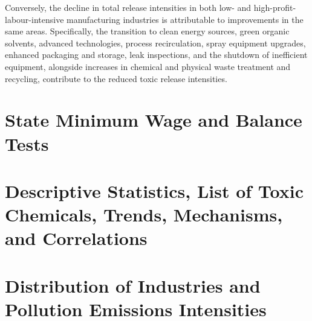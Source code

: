 \documentclass[12pt, english]{article}
\begin{document}
    Conversely, the decline in total release intensities in both low- and high-profit-labour-intensive manufacturing industries is attributable to improvements in the same areas. Specifically, the transition to clean energy sources, green organic solvents, advanced technologies, process recirculation, spray equipment upgrades, enhanced packaging and storage, leak inspections, and the shutdown of inefficient equipment, alongside increases in chemical and physical waste treatment and recycling, contribute to the reduced toxic release intensities.
    \newpage
    \begin{appendices}
        \renewcommand\thesection{\Roman{section}} %
        \renewcommand\thesubsection{\Alph{subsection}} %


        \section{State Minimum Wage and Balance Tests}\label{sec:appendix-state-minimum-wage-and-balance-tests}
        
        
        
        
        


        \section{Descriptive Statistics, List of Toxic Chemicals, Trends, Mechanisms, and Correlations}\label{sec:appendix-descriptive-stat-list-of-toxic-chemicals-trends-mechanisms-and-correlations}
        
        
        
        
        
        


        \section{Distribution of Industries and Pollution Emissions Intensities}\label{sec:appendix-distribution-of-industries-and-pollution-emissions-intensities}
        
        
        
        
        
        
        
        
        
        
        
        
        



\end{appendices}
\end{document}
